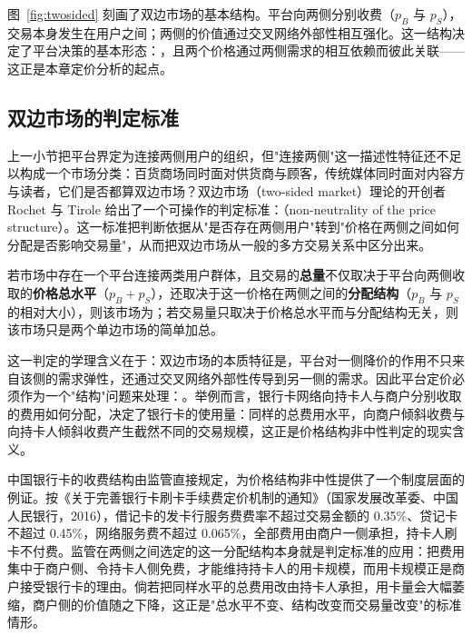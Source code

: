 图~\ref{fig:twosided} 刻画了双边市场的基本结构。平台向两侧分别收费（$p_B$ 与 $p_S$），交易本身发生在用户之间；两侧的价值通过交叉网络外部性相互强化。这一结构决定了平台决策的基本形态：，且两个价格通过两侧需求的相互依赖而彼此关联——这正是本章定价分析的起点。

\subsection{双边市场的判定标准}

上一小节把平台界定为连接两侧用户的组织，但"连接两侧"这一描述性特征还不足以构成一个市场分类：百货商场同时面对供货商与顾客，传统媒体同时面对内容方与读者，它们是否都算双边市场？双边市场（two-sided market）理论的开创者 Rochet 与 Tirole 给出了一个可操作的判定标准：（non-neutrality of the price structure）。这一标准把判断依据从"是否存在两侧用户"转到"价格在两侧之间如何分配是否影响交易量"，从而把双边市场从一般的多方交易关系中区分出来。

\begin{definition}
若市场中存在一个平台连接两类用户群体，且交易的\textbf{总量}不仅取决于平台向两侧收取的\textbf{价格总水平}（$p_B + p_S$），还取决于这一价格在两侧之间的\textbf{分配结构}（$p_B$ 与 $p_S$ 的相对大小），则该市场为；若交易量只取决于价格总水平而与分配结构无关，则该市场只是两个单边市场的简单加总。
\end{definition}

这一判定的学理含义在于：双边市场的本质特征是，平台对一侧降价的作用不只来自该侧的需求弹性，还通过交叉网络外部性传导到另一侧的需求。因此平台定价必须作为一个"结构"问题来处理：。举例而言，银行卡网络向持卡人与商户分别收取的费用如何分配，决定了银行卡的使用量：同样的总费用水平，向商户倾斜收费与向持卡人倾斜收费产生截然不同的交易规模，这正是价格结构非中性判定的现实含义。

中国银行卡的收费结构由监管直接规定，为价格结构非中性提供了一个制度层面的例证。按《关于完善银行卡刷卡手续费定价机制的通知》（国家发展改革委、中国人民银行，2016），借记卡的发卡行服务费费率不超过交易金额的 0.35\%、贷记卡不超过 0.45\%，网络服务费不超过 0.065\%，全部费用由商户一侧承担，持卡人刷卡不付费。监管在两侧之间选定的这一分配结构本身就是判定标准的应用：把费用集中于商户侧、令持卡人侧免费，才能维持持卡人的用卡规模，而用卡规模正是商户接受银行卡的理由。倘若把同样水平的总费用改由持卡人承担，用卡量会大幅萎缩，商户侧的价值随之下降，这正是"总水平不变、结构改变而交易量改变"的标准情形。

